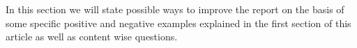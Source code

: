 \documentclass[../review.tex]{subfiles}
\begin{document}
In this section we will state possible ways to improve the report on the basis of some specific positive and negative examples explained in the first section of this article as well as content wise questions.
\end{document}

